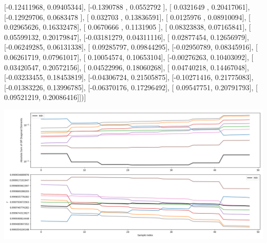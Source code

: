 \documentclass{article}
\begin{document}
       [-0.12411968,  0.09405344],
       [-0.1390788 ,  0.0552792 ],
       [ 0.0321649 ,  0.20417061],
       [-0.12929706,  0.0683478 ],
       [ 0.032703  ,  0.13836591],
       [ 0.0125976 ,  0.08910094],
       [ 0.02965626,  0.16332478],
       [ 0.0670666 ,  0.1131905 ],
       [ 0.08323838,  0.07165841],
       [ 0.05599132,  0.20179847],
       [-0.03181279,  0.04311116],
       [ 0.02877454,  0.12656979],
       [-0.06249285,  0.06131338],
       [ 0.09285797,  0.09844295],
       [-0.02950789,  0.08345916],
       [ 0.06261719,  0.07961017],
       [ 0.10054574,  0.10653104],
       [-0.00276263,  0.10403092],
       [ 0.03420547,  0.20572156],
       [ 0.04522996,  0.18060268],
       [ 0.04740218,  0.14467048],
       [-0.03233455,  0.18453819],
       [-0.04306724,  0.21505875],
       [-0.10271416,  0.21775083],
       [-0.01383226,  0.13996785],
       [-0.06370176,  0.17296492],
       [ 0.09547751,  0.20791793],
       [ 0.09521219,  0.20086416]])]
\begin{center}
\includegraphics[scale=.9]{report_pickled_controls149/control_dpn_all.png}

\end{center}
\end{document}
